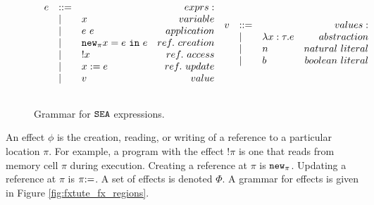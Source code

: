 \begin{figure}[h]

\[
\begin{array}{c}

\begin{array}{lllr}

e & ::= & ~ & exprs: \\
	& | & x & variable \\
	& | & e~e & application \\
	& | & \mathtt{new}_{\pi} x = e~\mathtt{in}~ e & ref.~creation\\
	& | & !x & ref.~access \\
	& | & x := e & ref.~update \\
	& | & v & value \\
	&&\\
	
\end{array}
	
\begin{array}{lllr}


v & ::= & ~ & values: \\
	& | & \lambda x: \tau. e & abstraction \\
	& | & n & natural~literal \\
	& | & b & boolean~literal \\
	&&\\
	

\end{array}
	
\end{array}
\]

\vspace{-12pt}
\caption{Grammar for $\mathtt{SEA}$ expressions.}
\label{fig:fx_tute}
\end{figure}

An effect $\phi$ is the creation, reading, or writing of a reference to a particular location $\pi$. For example, a program with the effect $!\pi$ is one that reads from memory cell $\pi$ during execution. Creating a reference at $\pi$ is $\mathtt{new}_{\pi}$. Updating a reference at $\pi$ is $\pi \mathtt{:=}$. A set of effects is denoted $\Phi$. A grammar for effects is given in Figure \ref{fig:fxtute_fx_regions}.

